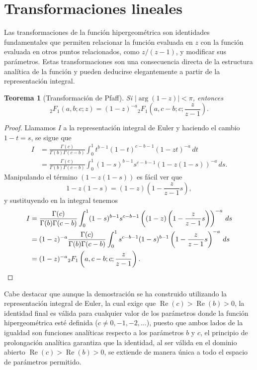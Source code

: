 \documentclass[12pt,a4paper]{book}
\renewcommand{\Re}{\operatorname{Re}}
\newtheorem{theorem}{Teorema}
\begin{document}
\section{Transformaciones lineales}

Las transformaciones de la función hipergeométrica son identidades fundamentales que permiten relacionar la función evaluada en $z$ con la función evaluada en otros puntos relacionados, como $z/(z-1)$, y modificar sus parámetros. Estas transformaciones son una consecuencia directa de la estructura analítica de la función y pueden deducirse elegantemente a partir de la representación integral.

\begin{theorem}[Transformación de Pfaff]
\label{teo:pfaff}
Si $|\arg(1-z)|<\pi$, entonces
\[
{}_{2}F_{1}(a, b; c; z) = (1-z)^{-a} {}_{2}F_{1}\left(a, c-b; c; \frac{z}{z-1}\right).
\]
\end{theorem}

\begin{proof}
Llamamos $I$ a la representación integral de Euler y haciendo el cambio $1-t=s$, se sigue que
\begin{align*}
    I &= \frac{\Gamma(c)}{\Gamma(b)\Gamma(c-b)} \int_0^1 t^{b-1} (1-t)^{c-b-1} (1-zt)^{-a} \, dt \\ &=
    \frac{\Gamma(c)}{\Gamma(b)\Gamma(c-b)} \int_0^1 (1-s)^{b-1} s^{c-b-1} (1-z(1-s))^{-a} \, ds.
\end{align*}
Manipulando el término $(1-z(1-s))$ es fácil ver que
\[ 
1-z(1-s)  = (1-z) \left( 1 - \frac{z}{z-1}s \right), 
\]
y sustituyendo en la integral tenemos
\begin{align*}
    I &= 
    \frac{\Gamma(c)}{\Gamma(b)\Gamma(c-b)} \int_0^1 (1-s)^{b-1} s^{c-b-1} \left((1-z)\left(1-\frac{z}{z-1}s\right)\right)^{-a} \, ds \\ &=
    (1-z)^{-a}\frac{\Gamma(c)}{\Gamma(b)\Gamma(c-b)} \int_0^1 s^{c-b-1}(1-s)^{b-1}  \left(1-\frac{z}{z-1}s\right)^{-a} \, ds \\ &=
    (1-z)^{-a} {}_{2}F_{1}\left(a, c-b; c; \frac{z}{z-1}\right).
    \qedhere
\end{align*}
\end{proof}

Cabe destacar que aunque la demostración se ha construido utilizando la representación integral de Euler, la cual exige que $\Re(c) > \Re(b) > 0$, la identidad final es válida para cualquier valor de los parámetros donde la función hipergeométrica esté definida ($c \neq 0, -1, -2, \dots$), puesto que ambos lados de la igualdad son funciones analíticas respecto a los parámetros $b$ y $c$, el principio de prolongación analítica garantiza que la identidad, al ser válida en el dominio abierto $\Re(c) > \Re(b) > 0$, se extiende de manera única a todo el espacio de parámetros permitido.
\end{document}
